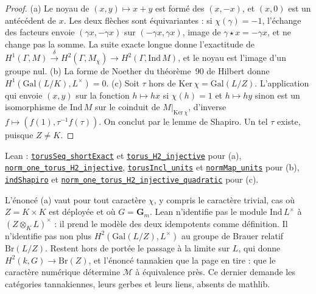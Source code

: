 \begin{proof}
(a) Le noyau de $(x, y) \mapsto x + y$ est formé des $(x, -x)$, et $(x, 0)$ est un antécédent de $x$. Les deux flèches sont équivariantes : si $\chi(\gamma) = -1$, l'échange des facteurs envoie $(\gamma x, -\gamma x)$ sur $(-\gamma x, \gamma x)$, image de $\gamma \star x = -\gamma x$, et ne change pas la somme. La suite exacte longue donne l'exactitude de $H^1(\Gamma, M) \xrightarrow{\delta} H^2(\Gamma, M_\chi) \to H^2(\Gamma, \mathrm{Ind}\,M)$, et le noyau est l'image d'un groupe nul. (b) La forme de Noether du théorème~90 de Hilbert donne $H^1(\mathrm{Gal}(L/K), L^\times) = 0$. (c) Soit $\tau$ hors de $\mathrm{Ker}\,\chi = \mathrm{Gal}(L/Z)$. L'application qui envoie $(x, y)$ sur la fonction $h \mapsto h x$ si $\chi(h) = 1$ et $h \mapsto h y$ sinon est un isomorphisme de $\mathrm{Ind}\,M$ sur le coinduit de $M|_{\mathrm{Ker}\,\chi}$, d'inverse $f \mapsto (f(1), \tau^{-1} f(\tau))$. On conclut par le lemme de Shapiro. Un tel $\tau$ existe, puisque $Z \neq K$.
\end{proof}

\noindent Lean : \href{\leanblobmain/RepresentationTheory/Folder10.lean}{\texttt{torusSeq\_shortExact}} et \href{\leanblobmain/RepresentationTheory/Folder10.lean}{\texttt{torus\_H2\_injective}} pour (a), \href{\leanblobmain/RepresentationTheory/Folder10.lean}{\texttt{norm\_one\_torus\_H2\_injective}}, \href{\leanblobmain/RepresentationTheory/Folder10.lean}{\texttt{torusIncl\_units}} et \href{\leanblobmain/RepresentationTheory/Folder10.lean}{\texttt{normMap\_units}} pour (b), \href{\leanblobmain/RepresentationTheory/Folder10.lean}{\texttt{indShapiro}} et \href{\leanblobmain/RepresentationTheory/Folder10.lean}{\texttt{norm\_one\_torus\_H2\_injective\_quadratic}} pour (c).

\begin{remarque}
L'énoncé (a) vaut pour tout caractère $\chi$, y compris le caractère trivial, cas où $Z = K \times K$ est déployée et où $G = \mathbf G_m$. Lean n'identifie pas le module $\mathrm{Ind}\,L^\times$ à $(Z \otimes_K L)^\times$ : il prend le modèle des deux idempotents comme définition. Il n'identifie pas non plus $H^2(\mathrm{Gal}(L/Z), L^\times)$ au groupe de Brauer relatif $\mathrm{Br}(L/Z)$. Restent hors de portée le passage à la limite sur $L$, qui donne $H^2(k, G) \to \mathrm{Br}(Z)$, et l'énoncé tannakien que la page en tire : que le caractère numérique détermine $\mathcal M$ à équivalence près. Ce dernier demande les catégories tannakiennes, leurs gerbes et leurs liens, absents de mathlib.
\end{remarque}
